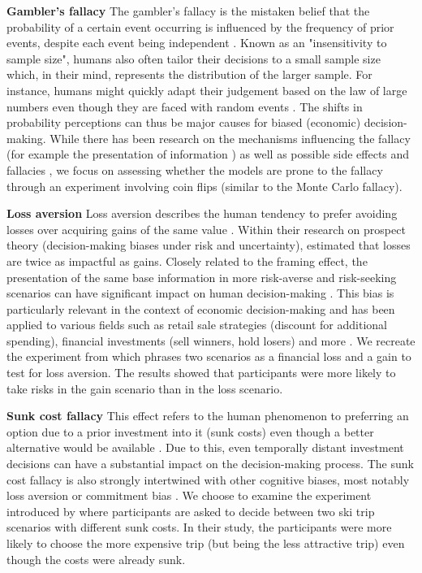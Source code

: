 \par \textbf{Gambler's fallacy} The gambler's fallacy is the mistaken belief that the probability of a certain event occurring is influenced by the frequency of prior events, despite each event being independent \parencite{bar1991perception,kovic2019gambler}. Known as an "insensitivity to sample size", humans also often tailor their decisions to a small sample size which, in their mind, represents the distribution of the larger sample. For instance, humans might quickly adapt their judgement based on the law of large numbers even though they are faced with random events \parencite{tversky1974judgment}. The shifts in probability perceptions can thus be major causes for biased (economic) decision-making. While there has been research on the mechanisms influencing the fallacy (for example the presentation of information \parencite{barron2010role}) as well as possible side effects and fallacies \parencite{kovic2019gambler}, we focus on assessing whether the models are prone to the fallacy through an experiment involving coin flips (similar to the Monte Carlo fallacy).

\par \textbf{Loss aversion} Loss aversion describes the human tendency to prefer avoiding losses over acquiring gains of the same value  \parencite{liu2023review}. Within their research on prospect theory (decision-making biases under risk and uncertainty), \textcite{tversky1992advances} estimated that losses are twice as impactful as gains. Closely related to the framing effect, the presentation of the same base information in more risk-averse and risk-seeking scenarios can have significant impact on human decision-making \parencite{druckman2001evaluating}. This bias is particularly relevant in the context of economic decision-making and has been applied to various fields such as retail sale strategies (discount for additional spending), financial investments (sell winners, hold losers) and more \parencite{liu2023review}. We recreate the experiment from \textcite{thaler2015misbehaving} which phrases two scenarios as a financial loss and a gain to test for loss aversion. The results showed that participants were more likely to take risks in the gain scenario than in the loss scenario.

\par \textbf{Sunk cost fallacy} This effect refers to the human phenomenon to preferring an option due to a prior investment into it (sunk costs) even though a better alternative would be available \parencite{arkes1985psychology}. Due to this, even temporally distant investment decisions can have a substantial impact on the decision-making process. The sunk cost fallacy is also strongly intertwined with other cognitive biases, most notably loss aversion or commitment bias \parencite{jarmolowicz2016sunk}. We choose to examine the experiment introduced by \textcite{arkes1985psychology} where participants are asked to decide between two ski trip scenarios with different sunk costs. In their study, the participants were more likely to choose the more expensive trip (but being the less attractive trip) even though the costs were already sunk.

